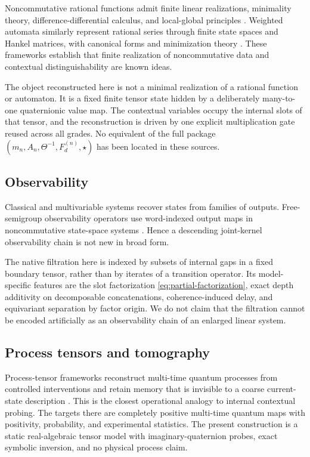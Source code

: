 \documentclass[11pt]{article}
\theoremstyle{definition}
\theoremstyle{remark}
\newcommand{\bridge}{\star}
\begin{document}
Noncommutative rational functions admit finite linear realizations, minimality theory, difference-differential calculus, and local-global principles \cite{kaliuzhnyi2010,volcic2015}.  Weighted automata similarly represent rational series through finite state spaces and Hankel matrices, with canonical forms and minimization theory \cite{balle2015}.  These frameworks establish that finite realization of noncommutative data and contextual distinguishability are known ideas.

The object reconstructed here is not a minimal realization of a rational function or automaton.  It is a fixed finite tensor state hidden by a deliberately many-to-one quaternionic value map.  The contextual variables occupy the internal slots of that tensor, and the reconstruction is driven by one explicit multiplication gate reused across all grades.  No equivalent of the full package $(m_n,A_n,\Theta^{-1},F_d^{(n)},\bridge)$ has been located in these sources.

\subsection{Observability}

Classical and multivariable systems recover states from families of outputs.  Free-semigroup observability operators use word-indexed output maps in noncommutative state-space systems \cite{ball2006}.  Hence a descending joint-kernel observability chain is not new in broad form.

The native filtration here is indexed by subsets of internal gaps in a fixed boundary tensor, rather than by iterates of a transition operator.  Its model-specific features are the slot factorization \eqref{eq:partial-factorization}, exact depth additivity on decomposable concatenations, coherence-induced delay, and equivariant separation by factor origin.  We do not claim that the filtration cannot be encoded artificially as an observability chain of an enlarged linear system.

\subsection{Process tensors and tomography}

Process-tensor frameworks reconstruct multi-time quantum processes from controlled interventions and retain memory that is invisible to a coarse current-state description \cite{pollock2015,pollock2018,xiang2021}.  This is the closest operational analogy to internal contextual probing.  The targets there are completely positive multi-time quantum maps with positivity, probability, and experimental statistics.  The present construction is a static real-algebraic tensor model with imaginary-quaternion probes, exact symbolic inversion, and no physical process claim.
\end{document}
